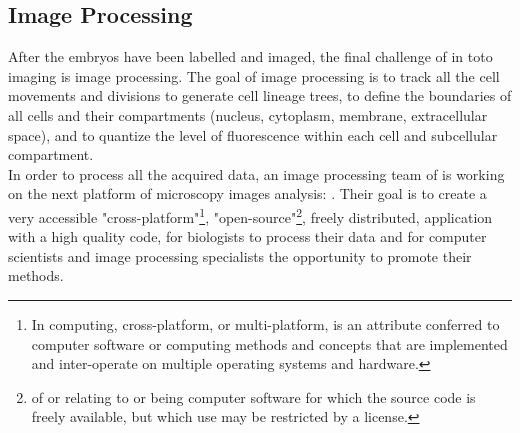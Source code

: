 \subsection{Image Processing}

After the embryos have been labelled and imaged, the final challenge of in toto
imaging is image processing. The goal of image processing is to track all the
cell movements and divisions to generate cell lineage trees, to define the
boundaries of all cells and their compartments (nucleus, cytoplasm, membrane,
extracellular space), and to quantize the level of fluorescence within each
cell and subcellular compartment.\\

In order to process all the acquired data, an image processing team of
is working on the next platform of microscopy images analysis: {\gofigure}.
Their goal is to create a very accessible "cross-platform"\footnote{In
computing, cross-platform, or multi-platform, is
an attribute conferred to computer software or computing methods and concepts
that are implemented and inter-operate on multiple operating systems and
hardware.}, "open-source"\footnote{of or
relating to or being computer software for which
the source code is freely available, but which use may be restricted by a
license.}, freely distributed, application with a high quality code, for
biologists to process their data and for computer scientists and image
processing specialists the opportunity to promote their methods.




%
%
%

